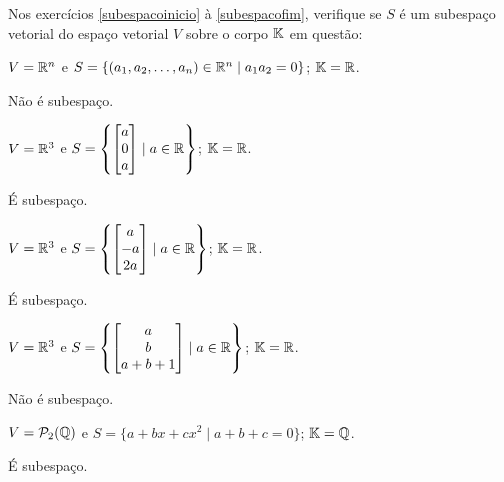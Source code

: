 \documentclass[12pt]{exam}
\begin{document}
Nos exercícios \ref{subespacoinicio} à \ref{subespacofim}, verifique se $S$ é um subespaço vetorial do espaço vetorial $V$ sobre o corpo $\mathbb{K}$ em questão:
\begin{exercicio}\label{subespacoinicio}
  $V = \mathbb{R}^n$ e $S = \{(a_1, a_2, \dots, a_n) \in \mathbb{R}^n \mid a_1a_2 = 0\}$; $\mathbb{K} = \mathbb{R}$.
  \begin{solucao}
    Não é subespaço.
  \end{solucao}
\end{exercicio}

\begin{exercicio}
    $V = \mathbb{R}^3$ e $S = \left\{\begin{bmatrix}a\\0\\a\end{bmatrix} \mid a \in \mathbb{R}\right\}$; $\mathbb{K} = \mathbb{R}$.
    \begin{solucao}
      É subespaço.
    \end{solucao}
\end{exercicio}

\begin{exercicio}
    $V = \mathbb{R}^3$ e $S = \left\{\begin{bmatrix}a\\-a\\2a\end{bmatrix} \mid a \in \mathbb{R}\right\}$; $\mathbb{K} = \mathbb{R}$.
    \begin{solucao}
      É subespaço.
    \end{solucao}
\end{exercicio}

\begin{exercicio}
    $V = \mathbb{R}^3$ e $S = \left\{\begin{bmatrix}a\\b\\a + b + 1\end{bmatrix} \mid a \in \mathbb{R}\right\}$; $\mathbb{K} = \mathbb{R}$.
    \begin{solucao}
      Não é subespaço.
    \end{solucao}
\end{exercicio}

\begin{exercicio}
    $V = \mathcal{P}_2(\mathbb{Q})$ e $S = \{a + bx + cx^2 \mid a + b + c = 0\}$; $\mathbb{K} = \mathbb{Q}$.
    \begin{solucao}
      É subespaço.
    \end{solucao}
\end{exercicio}
\end{document}
